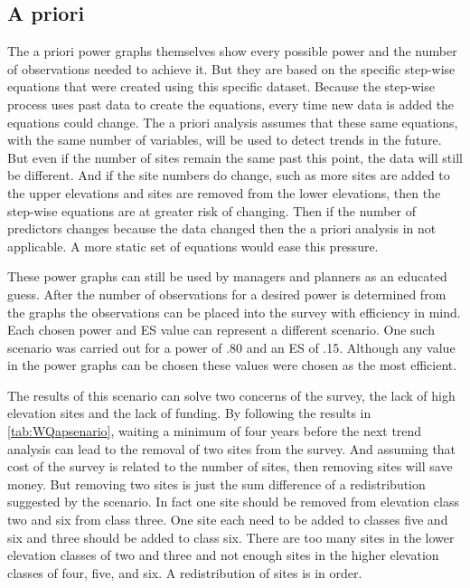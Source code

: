 \subsection{A priori}%

The a priori power graphs themselves show every possible power and the number of observations needed to achieve it.
But they are based on the specific step-wise equations that were created using this specific dataset.
Because the step-wise process uses past data to create the equations, every time new data is added the equations could change.
The a priori analysis assumes that these same equations, with the same number of variables, will be used to detect trends in the future.
But even if the number of sites remain the same past this point, the data will still be different.
And if the site numbers do change, such as more sites are added to the upper elevations and sites are removed from the lower elevations, then the step-wise equations are at greater risk of changing.
Then if the number of predictors changes because the data changed then the a priori analysis in not applicable.
A more static set of equations would ease this pressure.

These power graphs can still be used by managers and planners as an educated guess.
After the number of observations for a desired power is determined from the graphs the observations can be placed into the survey with efficiency in mind.
Each chosen power and ES value can represent a different scenario.
One such scenario was carried out for a power of .80 and an ES of .15.
Although any value in the power graphs can be chosen these values were chosen as the most efficient. 

The results of this scenario can solve two concerns of the survey, the lack of high elevation sites and the lack of funding.
By following the results in \autoref{tab:WQapsenario}, waiting a minimum of four years before the next trend analysis can lead to the removal of two sites from the survey.
And assuming that cost of the survey is related to the number of sites, then removing sites will save money.
But removing two sites is just the sum difference of a redistribution suggested by the scenario.
In fact one site should be removed from elevation class two and six from class three.
One site each need to be added to classes five and six and three should be added to class six.
There are too many sites in the lower elevation classes of two and three and not enough sites in the higher elevation classes of four, five, and six.
A redistribution of sites is in order.

